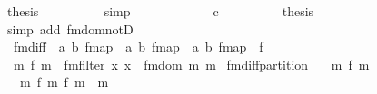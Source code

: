 \begin{isabellebody}
\ {\isacharquery}{\kern0pt}thesis\isanewline
\ \ \ \ \ \ \ \ \isamarkupfalse%
\ simp\isanewline
\ \ \ \ \isamarkupfalse%
\isanewline
\ \ \ \ \ \ \isamarkupfalse%
\ c\isanewline
\ \ \ \ \ \ \isamarkupfalse%
\ \isamarkupfalse%
\ {\isacharquery}{\kern0pt}thesis\isanewline
\ \ \ \ \ \ \ \ \isamarkupfalse%
\ {\isacharparenleft}{\kern0pt}simp\ add{\isacharcolon}{\kern0pt}\ fmdom{\isacharprime}{\kern0pt}{\isacharunderscore}{\kern0pt}notD{\isacharparenright}{\kern0pt}\isanewline
\ \ \ \ \isamarkupfalse%
\isanewline
\ \ \isamarkupfalse%
\isanewline
{}\isamarkupfalse%
%
\endisatagproof
{\isafoldproof}%
%
\isadelimproof
\isanewline
%
\endisadelimproof
\isanewline
{}\isamarkupfalse%
\isanewline
\ \ fmdiff\ {\isacharcolon}{\kern0pt}{\isacharcolon}{\kern0pt}\ {\isachardoublequoteopen}{\isacharparenleft}{\kern0pt}{\isacharprime}{\kern0pt}a{\isacharcomma}{\kern0pt}\ {\isacharprime}{\kern0pt}b{\isacharparenright}{\kern0pt}\ fmap\ {\isasymRightarrow}\ {\isacharparenleft}{\kern0pt}{\isacharprime}{\kern0pt}a{\isacharcomma}{\kern0pt}\ {\isacharprime}{\kern0pt}b{\isacharparenright}{\kern0pt}\ fmap\ {\isasymRightarrow}\ {\isacharparenleft}{\kern0pt}{\isacharprime}{\kern0pt}a{\isacharcomma}{\kern0pt}\ {\isacharprime}{\kern0pt}b{\isacharparenright}{\kern0pt}\ fmap{\isachardoublequoteclose}\ {\isacharparenleft}{\kern0pt}\ {\isacartoucheopen}{\isacharminus}{\kern0pt}{\isacharminus}{\kern0pt}\isactrlsub f{\isacartoucheclose}\ {}{}{}{\isacharparenright}{\kern0pt}\ \isanewline
\ \ {\isachardoublequoteopen}m\ {\isacharminus}{\kern0pt}{\isacharminus}{\kern0pt}\isactrlsub f\ m\ {\isasymequiv}\ fmfilter\ {\isacharparenleft}{\kern0pt}{\isasymlambda}x{\isachardot}{\kern0pt}\ x\ {\isasymnotin}\ fmdom{\isacharprime}{\kern0pt}\ m\ m\isanewline
\isanewline
{}\isamarkupfalse%
\ fmdiff{\isacharunderscore}{\kern0pt}partition{\isacharcolon}{\kern0pt}\isanewline
\ \ \ {\isachardoublequoteopen}m\ {\isasymsubseteq}\isactrlsub f\ m\isanewline
\ \ \ {\isachardoublequoteopen}m\ {\isacharplus}{\kern0pt}{\isacharplus}{\kern0pt}\isactrlsub f\ {\isacharparenleft}{\kern0pt}m\ {\isacharminus}{\kern0pt}{\isacharminus}{\kern0pt}\isactrlsub f\ m\ {\isacharequal}{\kern0pt}\ m\isanewline

\end{isabellebody}
